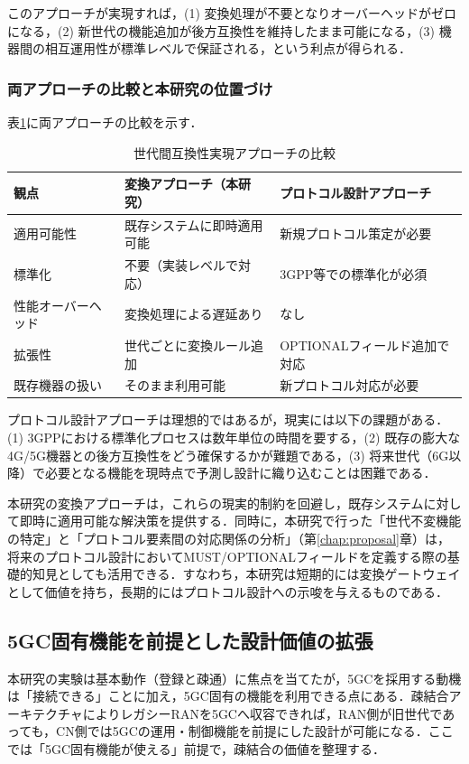 このアプローチが実現すれば，(1) 変換処理が不要となりオーバーヘッドがゼロになる，(2) 新世代の機能追加が後方互換性を維持したまま可能になる，(3) 機器間の相互運用性が標準レベルで保証される，という利点が得られる．

\subsubsection{両アプローチの比較と本研究の位置づけ}
表\ref{tab:approach_comparison}に両アプローチの比較を示す．

\begin{table}[htbp]
\centering
\caption{世代間互換性実現アプローチの比較}
\label{tab:approach_comparison}
\begin{tabular}{|p{3cm}|p{5.5cm}|p{5.5cm}|}
\hline
\textbf{観点} & \textbf{変換アプローチ（本研究）} & \textbf{プロトコル設計アプローチ} \\
\hline
適用可能性 & 既存システムに即時適用可能 & 新規プロトコル策定が必要 \\
\hline
標準化 & 不要（実装レベルで対応） & 3GPP等での標準化が必須 \\
\hline
性能オーバーヘッド & 変換処理による遅延あり & なし \\
\hline
拡張性 & 世代ごとに変換ルール追加 & OPTIONALフィールド追加で対応 \\
\hline
既存機器の扱い & そのまま利用可能 & 新プロトコル対応が必要 \\
\hline
\end{tabular}
\end{table}

プロトコル設計アプローチは理想的ではあるが，現実には以下の課題がある．(1) 3GPPにおける標準化プロセスは数年単位の時間を要する，(2) 既存の膨大な4G/5G機器との後方互換性をどう確保するかが難題である，(3) 将来世代（6G以降）で必要となる機能を現時点で予測し設計に織り込むことは困難である．

本研究の変換アプローチは，これらの現実的制約を回避し，既存システムに対して即時に適用可能な解決策を提供する．同時に，本研究で行った「世代不変機能の特定」と「プロトコル要素間の対応関係の分析」（第\ref{chap:proposal}章）は，将来のプロトコル設計においてMUST/OPTIONALフィールドを定義する際の基礎的知見としても活用できる．すなわち，本研究は短期的には変換ゲートウェイとして価値を持ち，長期的にはプロトコル設計への示唆を与えるものである．

\subsection{5GC固有機能を前提とした設計価値の拡張}
本研究の実験は基本動作（登録と疎通）に焦点を当てたが，5GCを採用する動機は「接続できる」ことに加え，5GC固有の機能を利用できる点にある．疎結合アーキテクチャによりレガシーRANを5GCへ収容できれば，RAN側が旧世代であっても，CN側では5GCの運用・制御機能を前提にした設計が可能になる．ここでは「5GC固有機能が使える」前提で，疎結合の価値を整理する．

